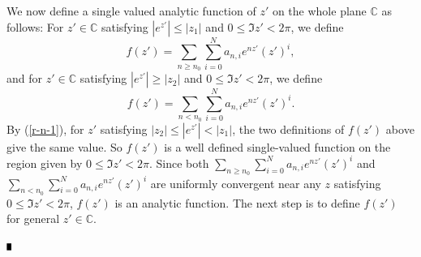 \documentclass[12pt]{article}
\newcommand{\halmos}{\rule{1ex}{1.4ex}}
\newcommand{\epfv}{\hspace*{\fill}\mbox{$\halmos$}\vspace{1em}}
\newcommand{\C}{\mathbb{C}}
\begin{document}
We now define a single valued analytic function of $z'$
on the whole plane $\C$ as follows:
For $z'\in \C$ satisfying $|e^{z'}|\le |z_{1}|$ and $0\le \Im{z'}<2\pi$, 
we define
\begin{equation}
f(z')=\sum_{n\ge n_{0}}\sum_{i=0}^{N}a_{n, i}e^{nz'}(z')^{i},
\end{equation}
and for $z'\in \C$ satisfying $|e^{z'}|\ge |z_{2}|$ and $0\le \Im{z'}<2\pi$, 
we define
\[
f(z')=\sum_{n<n_{0}}\sum_{i=0}^{N}a_{n, i}e^{nz'}(z')^{i}.
\]
By (\ref{r-n-1}), for $z'$ satisfying $|z_{2}|\le |e^{z'}|<|z_{1}|$,
the two definitions of $f(z')$ above give the same value. So $f(z')$ 
is a well defined single-valued function on the region given by 
$0\le \Im{z'}<2\pi$. Since both 
$\sum_{n\ge n_{0}}\sum_{i=0}^{N}a_{n, i}e^{nz'}(z')^{i}$
and $\sum_{n<n_{0}}\sum_{i=0}^{N}a_{n, i}e^{nz'}(z')^{i}$
are uniformly convergent near any $z$ satisfying $0\le \Im{z'}<2\pi$,
$f(z')$ is an analytic function. The next step is to define $f(z')$ 
for general $z'\in \C$. 




\epfv
\end{document}
